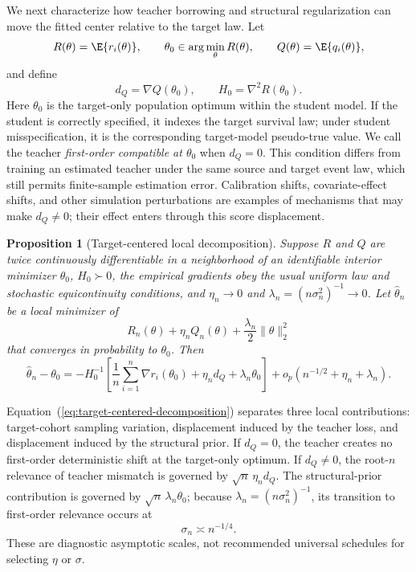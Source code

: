 \documentclass{article} %
\renewcommand{\eqref}[1]{\textup{(\ref{#1})}}
\newtheorem{proposition}{Proposition}
\begin{document}
We next characterize how teacher borrowing and structural regularization can move the fitted center relative to the target law. Let
\begin{equation}
R(\theta)=\E\{r_i(\theta)\},
\qquad
\theta_0\in\arg\min_\theta R(\theta),
\qquad
Q(\theta)=\E\{q_i(\theta)\},
\label{eq:population-risks-main}
\end{equation}
and define
\begin{equation}
d_Q=\nabla Q(\theta_0),
\qquad
H_0=\nabla^2R(\theta_0).
\label{eq:target-gradient-main}
\end{equation}
Here $\theta_0$ is the target-only population optimum within the student model. If the student is correctly specified, it indexes the target survival law; under student misspecification, it is the corresponding target-model pseudo-true value. We call the teacher \emph{first-order compatible at $\theta_0$} when $d_Q=0$. This condition differs from training an estimated teacher under the same source and target event law, which still permits finite-sample estimation error. Calibration shifts, covariate-effect shifts, and other simulation perturbations are examples of mechanisms that may make $d_Q\neq0$; their effect enters through this score displacement.

\begin{proposition}[Target-centered local decomposition]
\label{prop:target-centered-main}
Suppose $R$ and $Q$ are twice continuously differentiable in a neighborhood of an identifiable interior minimizer $\theta_0$, $H_0\succ0$, the empirical gradients obey the usual uniform law and stochastic equicontinuity conditions, and $\eta_n\to0$ and $\lambda_n=(n\sigma_n^2)^{-1}\to0$. Let $\widehat\theta_n$ be a local minimizer of
\[
R_n(\theta)+\eta_nQ_n(\theta)+\frac{\lambda_n}{2}\|\theta\|_2^2
\]
that converges in probability to $\theta_0$. Then
\begin{equation}
\boxed{
\widehat\theta_n-\theta_0
=
-H_0^{-1}
\left[
\frac1n\sum_{i=1}^n\nabla r_i(\theta_0)
+
\eta_n d_Q
+
\lambda_n\theta_0
\right]
+
o_p\!\left(n^{-1/2}+\eta_n+\lambda_n\right).
}
\label{eq:target-centered-decomposition}
\end{equation}
\end{proposition}

Equation~\eqref{eq:target-centered-decomposition} separates three local contributions: target-cohort sampling variation, displacement induced by the teacher loss, and displacement induced by the structural prior. If $d_Q=0$, the teacher creates no first-order deterministic shift at the target-only optimum. If $d_Q\neq0$, the root-$n$ relevance of teacher mismatch is governed by $\sqrt n\,\eta_n d_Q$. The structural-prior contribution is governed by $\sqrt n\,\lambda_n\theta_0$; because $\lambda_n=(n\sigma_n^2)^{-1}$, its transition to first-order relevance occurs at
\begin{equation}
\sigma_n\asymp n^{-1/4}.
\label{eq:sigma-boundary-main}
\end{equation}
These are diagnostic asymptotic scales, not recommended universal schedules for selecting $\eta$ or $\sigma$.
\end{document}
